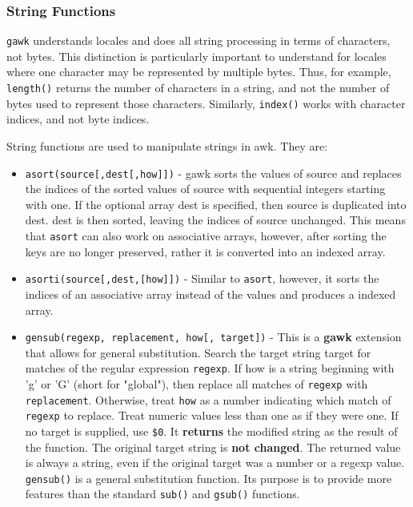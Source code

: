 \subsubsection{String Functions}

\lstinline|gawk| understands locales and does all string processing in terms of characters, not bytes. This distinction is particularly important to understand for locales where one character may be represented by multiple bytes. Thus, for example, \lstinline|length()| returns the number of characters in a string, and not the number of bytes used to represent those characters. Similarly, \lstinline|index()| works with character indices, and not byte indices.

String functions are used to manipulate strings in awk. They are:

\begin{itemize}
  \item \lstinline|asort(source[,dest[,how]])| - gawk sorts the values of source and replaces the indices of the sorted values of source with sequential integers starting with one. If the optional array dest is specified, then source is duplicated into dest. dest is then sorted, leaving the indices of source unchanged. This means that \lstinline|asort| can also work on associative arrays, however, after sorting the keys are no longer preserved, rather it is converted into an indexed array.
  \item \lstinline|asorti(source[,dest,[how]])| - Similar to \lstinline|asort|, however, it sorts the indices of an associative array instead of the values and produces a indexed array.
  \item \lstinline|gensub(regexp, replacement, how[, target])| - This is a \textbf{gawk} extension that allows for general substitution.
    Search the target string target for matches of the regular expression \lstinline|regexp|. If how is a string beginning with 'g' or 'G' (short for "global"), then replace all matches of \lstinline|regexp| with \lstinline|replacement|.
    Otherwise, treat \lstinline|how| as a number indicating which match of \lstinline|regexp| to replace. Treat numeric values less than one as if they were one. If no target is supplied, use \lstinline|$0|. It \textbf{returns} the modified string as the result of the function. The original target string is \textbf{not changed}.
The returned value is always a string, even if the original target was a number or a regexp value.
\lstinline|gensub()| is a general substitution function. Its purpose is to provide more features than the standard \lstinline|sub()| and \lstinline|gsub()| functions.

\end{itemize}
